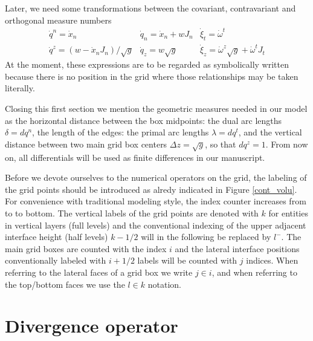 Later, we need some transformations between the covariant, contravariant and orthogonal measure numbers
\begin{equation}
\begin{array}{lll}
\dot{q}^n=\dot{x}_n&
\dot{q}_n=\dot{x}_n+wJ_n&
\dot{\xi}_t=\dot{\omega}^t\\
\dot{q}^z=\left(w-\dot{x}_nJ_n\right)/\sqrt{g}&
\dot{q}_z=w\sqrt{g}&
\dot{\xi}_z=\dot{\omega}^z\sqrt{g}+\dot{\omega}^tJ_t
\end{array}
\label{conversions}
\end{equation}
At the moment, these expressions are to be regarded as symbolically written because there is no position in the grid where those relationships may be taken literally.

Closing this first section we mention the geometric
measures needed in our model as the horizontal distance between the box midpoints: the dual arc lengths
$\delta=dq^n$, the length of the edges: the primal arc lengths $\lambda=dq^t$, and the vertical distance
between two main grid box centers $\Delta z=\sqrt{g}$, so that $dq^z=1$. From now on, all differentials will be used as finite differences in our manuscript. 

Before we devote ourselves to the numerical operators on the grid, the labeling of the grid points should
be introduced as alredy indicated in Figure \ref{cont_volu}. For convenience with traditional modeling style, the index counter increases from to to bottom. The vertical labels of the grid points are
denoted with $k$ for entities in vertical layers (full levels) and the conventional indexing of the upper adjacent interface height (half levels) $k-1/2$ will in the following be replaced by $l^-$. The main grid boxes are counted with the index $i$ and the lateral interface positions conventionally labeled with
$i+1/2$ labels will be counted with $j$ indices. When referring to the lateral faces of a grid box we write $j\in i$, and when referring to the top/bottom faces we use the $l\in k$ notation.

\section{Divergence operator}

